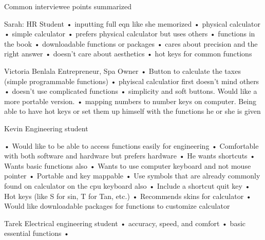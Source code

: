 \documentclass{article}
\begin{document}
Common interviewee points summarized

Sarah: 
HR Student 
• inputting full eqn like she memorized
• physical calculator 
• simple calculator
• prefers physical calculator but uses others
• functions in the book
• downloadable functions or packages
• cares about precision and the right answer
• doesn’t care about aesthetics
• hot keys for common functions

Victoria  Benlala
Entrepreneur, Spa Owner
• Button to calculate the taxes (simple programmable functions)
• phyiscal calculatior first doesn’t mind others
• doesn’t use complicated functions
• simplicity and soft buttons. Would like a more portable version.
• mapping numbers to number keys on computer. Being able to have hot keys or set them up himself with the functions he or she is given

Kevin
Engineering student

• Would like to be able to access functions easily for engineering 
• Comfortable with both software and hardware but prefers hardware
• He wants shortcuts
• Wants basic functions also
• Wants to use computer keyboard and not mouse pointer
• Portable and key mappable
• Use symbols that are already commonly found on calculator on the cpu keyboard also 
• Include a shortcut quit key
• Hot keys (like S for sin, T for Tan, etc.)
• Recommends skins for calculator
• Would like downloadable packages for functions to customize calculator

Tarek
Electrical engineering student
• accuracy, speed, and comfort
• basic essential functions
•
\end{document}
